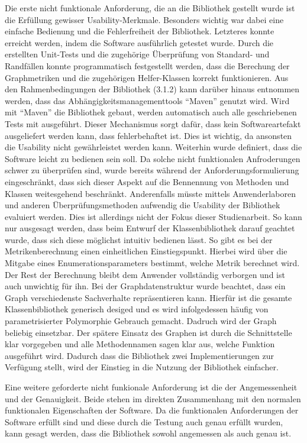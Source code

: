 \documentclass[a4paper,12pt,ngerman,chapterprefix=false,listof=totoc,bibliography=totoc]{scrreprt}
\begin{document}
{{{Die erste nicht funktionale Anforderung, die an die Bibliothek gestellt wurde ist die Erfüllung gewisser Usability-Merkmale. Besonders wichtig war dabei eine einfache Bedienung und die Fehlerfreiheit der Bibliothek. Letzteres konnte erreicht werden, indem die Software ausführlich getestet wurde. Durch die erstellten Unit-Tests und die zugehörige Überprüfung von Standard- und Randfällen konnte programmatisch festgestellt werden, dass die Berechung der Graphmetriken und die zugehörigen Helfer-Klassen korrekt funktionieren. Aus den Rahmenbedingungen der Bibliothek (3.1.2) kann darüber hinaus entnommen werden, dass das Abhängigkeitsmanagementtools "`Maven"' genutzt wird. Wird mit "`Maven"' die Bibliothek gebaut, werden automatisch auch alle geschriebenen Tests mit ausgeführt. Dieser Mechanismus sorgt dafür, dass kein Softwareartefakt ausgeliefert werden kann, dass fehlerbehaftet ist. Dies ist wichtig, da ansonsten die Usability nicht gewährleistet werden kann. Weiterhin wurde definiert, dass die Software leicht zu bedienen sein soll. Da solche nicht funktionalen Anfroderungen schwer zu überprüfen sind, wurde bereits während der Anforderungsformulierung eingeschränkt, dass sich dieser Aspekt auf die Bennennung von Methoden und Klassen weitesgehend beschränkt. Anderenfalls müsste mittels Anwenderlaboren und anderen Überprüfungsmethoden aufwendig die Usability der Bibliothek evaluiert werden. Dies ist allerdings nicht der Fokus dieser Studienarbeit. So kann nur ausgesagt werden, dass beim Entwurf der Klassenbibliothek darauf geachtet wurde, dass sich diese möglichst intuitiv bedienen lässt. So gibt es bei der Metrikenberechnung einen einheitlichen Einstiegspunkt. Hierbei wird über die Mitgabe eines Enumerationsparameters bestimmt, welche Metrik berechnet wird. Der Rest der Berechnung bleibt dem Anwender vollständig verborgen und ist auch unwichtig für ihn. Bei der Graphdatenstruktur wurde beachtet, dass ein Graph verschiedenste Sachverhalte repräsentieren kann. Hierfür ist die gesamte Klassenbibliothek generisch desiged und es wird infolgedessen häufig von parametrisierter Polymorphie Gebrauch gemacht. Dadruch wird der Graph beliebig einsetzbar. Der spätere Einsatz des Graphen ist durch die Schnittstelle klar vorgegeben und alle Methodennamen sagen klar aus, welche Funktion ausgeführt wird. Dadurch dass die Bibliothek zwei Implementierungen zur Verfügung stellt, wird der Einstieg in die Nutzung der Bibliothek einfacher.

Eine weitere geforderte nicht funkionale Anforderung ist die der Angemessenheit und der Genauigkeit. Beide stehen im direkten Zusammenhang mit den normalen funktionalen Eigenschaften der Software. Da die funktionalen Anforderungen der Software erfüllt sind und diese durch die Testung auch genau erfüllt wurden, kann gesagt werden, dass die Bibliothek sowohl angemessen als auch genau ist.

}}}
\end{document}
